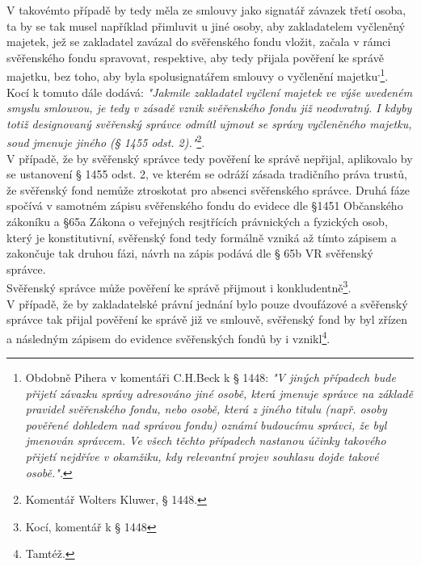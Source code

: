 \documentclass{article}
\begin{document}
V takovémto případě by tedy měla ze smlouvy jako signatář závazek třetí osoba, ta by se tak musel například přimluvit u jiné osoby, aby zakladatelem vyčleněný majetek, jež se zakladatel zavázal do svěřenského fondu vložit, začala v rámci svěřenského fondu spravovat, respektive, aby tedy přijala pověření ke správě majetku, bez toho, aby byla spolusignatářem smlouvy o vyčlenění majetku\textsuperscript{,}\footnote{Obdobně Pihera v komentáři C.H.Beck k § 1448: \textit{"V jiných případech bude přijetí závazku správy adresováno jiné osobě, která jmenuje správce na základě pravidel svěřenského fondu, nebo osobě, která z jiného titulu (např. osoby pověřené dohledem nad správou fondu) oznámí budoucímu správci, že byl jmenován správcem. Ve všech těchto případech nastanou účinky takového přijetí nejdříve v okamžiku, kdy relevantní projev souhlasu dojde takové osobě."}.}.\\

Kocí k tomuto dále dodává: \textit{"Jakmile zakladatel vyčlení majetek ve výše uvedeném smyslu smlouvou, je tedy v zásadě vznik svěřenského fondu již neodvratný. I kdyby totiž designovaný svěřenský správce odmítl ujmout se správy vyčleněného majetku, soud jmenuje jiného (§ 1455 odst. 2)."}\footnote{Komentář Wolters Kluwer, § 1448.}.\\

V případě, že by svěřenský správce tedy pověření ke správě nepřijal, aplikovalo by se ustanovení § 1455 odst. 2, ve kterém se odráží zásada tradičního práva trustů, že svěřenský fond nemůže ztroskotat pro absenci svěřenského správce. Druhá fáze spočívá v samotném zápisu svěřenského fondu do evidece dle §1451 Občanského zákoníku a §65a Zákona o veřejných resjtřících právnických a fyzických osob, který je konstitutivní, svěřenský fond tedy formálně vzniká až tímto zápisem a zakončuje tak druhou fázi, návrh na zápis podává dle § 65b VR svěřenský správce.\\

Svěřenský správce může pověření ke správě přijmout i konkludentně\footnote{Kocí, komentář k § 1448}.\\

V případě, že by zakladatelské právní jednání bylo pouze dvoufázové a svěřenský správce tak přijal pověření ke správě již ve smlouvě, svěřenský fond by byl zřízen a následným zápisem do evidence svěřenských fondů by i vznikl\footnote{Tamtéž.}.\\
\end{document}
